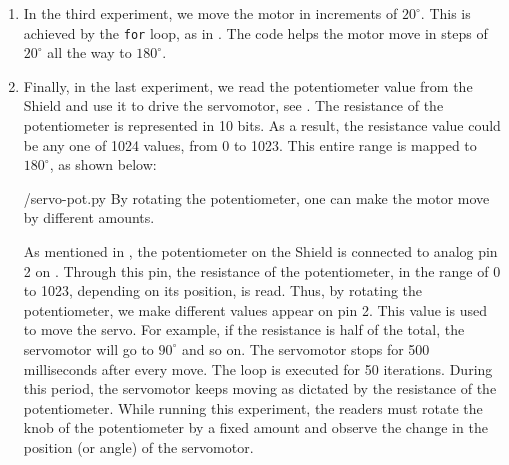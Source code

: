 \begin{enumerate}
        
  \item In the third experiment, we move the motor in increments of
        $20^\circ$.  This is achieved by the {\tt for} loop, as in
        . The code helps the motor move in steps of $20^\circ$ all
        the way to $180^\circ$.  
        
  \item Finally, in the last experiment, we read the potentiometer value
        from the Shield and use it to drive the servomotor, see
        .  The resistance of the potentiometer is
        represented in 10 bits.  As a result, the resistance value could be
        any one of 1024 values, from 0 to 1023.  This entire range is
        mapped to $180^\circ$, as shown below:
        
        {\LocSERpycode/servo-pot.py}
        By rotating the potentiometer, one can make
        the motor move by different amounts.
        
        As mentioned in , the potentiometer on the Shield is connected 
        to analog pin 2 on \arduino. Through this pin, the resistance of the potentiometer, in the range of 0 to 1023,
        depending on its position, is read.  Thus, by rotating the
        potentiometer, we make different values appear on pin 2.  This value
        is used to move the servo.  For example, if the resistance is half
        of the total, the servomotor will go to $90^\circ$ and so on.  The
        servomotor stops for 500 milliseconds after every move.  The loop is
        executed for 50 iterations. During this period, the servomotor keeps moving as dictated by the
        resistance of the potentiometer. While running this experiment, the readers 
        must rotate the knob of the potentiometer by a fixed amount and observe 
        the change in the position (or angle) of the servomotor.   
        
        

\end{enumerate}
